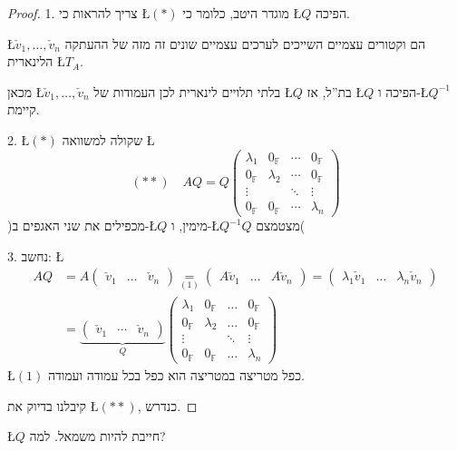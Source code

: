 \documentclass[english,hebrew]{article}
\begin{document}
\begin{proof}
1. צריך להראות כי \L{$(*)$} מוגדר היטב, כלומר כי \L{$Q$} הפיכה.

\L{$\check{v}_{1},\dots,\check{v}_{n}$} הם וקטורים עצמיים השייכים
לערכים עצמיים שונים זה מזה של ההעתקה הלינארית \L{$T_{A}$}.

מכאן \L{$\check{v}_{1},\dots,\check{v}_{n}$} בלתי תלויים לינארית
לכן העמודות של \L{$Q$} בת\textquotedblright ל, אז \L{$Q$} הפיכה
ו-\L{$Q^{-1}$} קיימת.

2. \L{$(*)$} שקולה למשוואה \L{%
\[
(**)\quad AQ=Q\begin{pmatrix}\lambda_{1} & 0_{\mathbb{F}} & \cdots & 0_{\mathbb{F}}\\
0_{\mathbb{F}} & \lambda_{2} & \cdots & 0_{\mathbb{F}}\\
\vdots &  & \ddots & \vdots\\
0_{\mathbb{F}} & 0_{\mathbb{F}} & \cdots & \lambda_{n}
\end{pmatrix}
\]
}%
)מכפילים את שני האגפים ב-\L{$Q$} מימין, ו-\L{$Q^{-1}Q$} מצטמצם(

3. נחשב: \L{%
\begin{align*}
AQ & =A\begin{pmatrix}\check{v}_{1} & \dots & \check{v}_{n}\end{pmatrix}\underset{(1)}{=}\begin{pmatrix}A\check{v}_{1} & \dots & A\check{v}_{n}\end{pmatrix}=\begin{pmatrix}\lambda_{1}\check{v}_{1} & \dots & \lambda_{n}\check{v}_{n}\end{pmatrix}\\
 & =\underset{Q}{\underbrace{\begin{pmatrix}\check{v}_{1} & \cdots & \check{v}_{n}\end{pmatrix}}}\begin{pmatrix}\lambda_{1} & 0_{\mathbb{F}} & \dots & 0_{\mathbb{F}}\\
0_{\mathbb{F}} & \lambda_{2} & \dots & 0_{\mathbb{F}}\\
\vdots &  & \ddots & \vdots\\
0_{\mathbb{F}} & 0_{\mathbb{F}} & \dots & \lambda_{n}
\end{pmatrix}
\end{align*}
}%
\L{$(1)$} כפל מטריצה במטריצה הוא כפל בכל עמודה ועמודה.

קיבלנו בדיוק את \L{$(**)$}, כנדרש. 
\end{proof}
\L{$Q$} חייבת להיות משמאל. למה?
\end{document}
